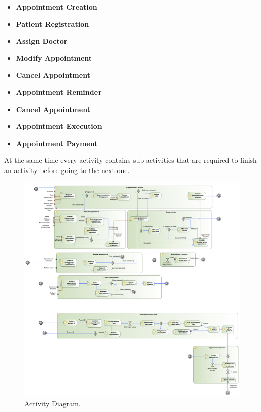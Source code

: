 \documentclass{article}
\begin{document}
{            \begin{itemize}
                    \item \textbf{Appointment Creation}
                    \item \textbf{Patient Registration}
                    \item \textbf{Assign Doctor}
                    \item \textbf{Modify Appointment}
                    \item \textbf{Cancel Appointment}
                    \item \textbf{Appointment Reminder}
                    \item \textbf{Cancel Appointment}
                    \item \textbf{Appointment Execution}
                    \item \textbf{Appointment Payment}
            \end{itemize}

            At the same time every activity contains sub-activities that are required to finish an activity before going to the next one.
            
            \begin{figure}[H]
                \centering 
                \includegraphics[width=1\linewidth]{./img/Activity.png}
                \caption{Activity Diagram.}
                \label{fig:activity}
            \end{figure}

}
\end{document}
